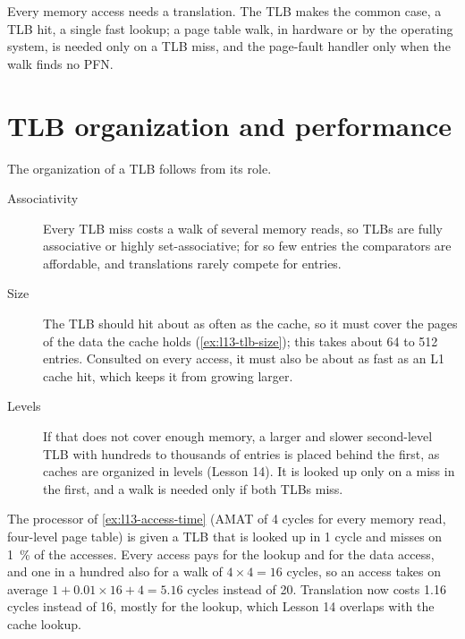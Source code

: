 \documentclass[../main.tex]{subfiles}
\begin{document}
\begin{keypoint}
  Every memory access needs a translation.  The TLB makes the common case, a
  TLB hit, a single fast lookup; a page table walk, in hardware or by the
  operating system, is needed only on a TLB miss, and the page-fault handler
  only when the walk finds no PFN.
\end{keypoint}

\section{TLB organization and performance}
\label{sec:l13-tlb-org}

The organization of a TLB follows from its role.
\begin{description}
  \item[Associativity] Every TLB miss costs a walk of several memory reads, so
    TLBs are fully associative or highly set-associative; for so few entries
    the comparators are affordable, and translations rarely compete for
    entries.
  \item[Size] The TLB should hit about as often as the cache, so it must cover
    the pages of the data the cache holds (\cref{ex:l13-tlb-size}); this takes
    about 64 to 512 entries.  Consulted on every access, it must also be about
    as fast as an L1 cache hit, which keeps it from growing larger.
  \item[Levels] If that does not cover enough memory, a larger and slower
    second-level TLB with hundreds to thousands of entries is placed behind the
    first, as caches are organized in levels (Lesson 14).  It is looked up only
    on a miss in the first, and a walk is needed only if both TLBs miss.
\end{description}

\begin{example}
  \label{ex:l13-tlb-performance}
  The processor of \cref{ex:l13-access-time} (AMAT of 4 cycles for every
  memory read, four-level page table) is given a TLB that is looked up in
  1 cycle and misses on \SI{1}{\percent} of the accesses.  Every access pays
  for the lookup and for the data access, and one in a hundred also for a walk
  of $4 \times 4 = 16$ cycles, so an access takes on average
  $1 + 0.01 \times 16 + 4 = 5.16$ cycles instead of 20.  Translation now costs
  1.16 cycles instead of 16, mostly for the lookup, which Lesson 14 overlaps
  with the cache lookup.
\end{example}
\end{document}

